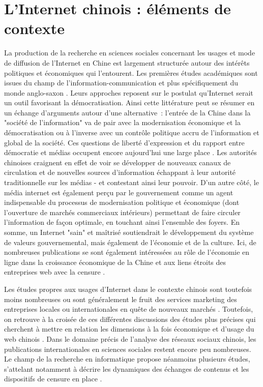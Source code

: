 \section{L’Internet chinois : éléments de contexte }
La production de la recherche en sciences sociales concernant les usages et mode de diffusion de l’Internet en Chine est largement structurée autour des intérêts politiques et économiques qui l’entourent. Les premières études académiques sont issues du champ de l’information-communication et plus spécifiquement du monde anglo-saxon \citep{Johnson1996,Qiu2005}. Leurs approches reposent sur le postulat qu'Internet serait un outil favorisant la démocratisation. Ainsi cette littérature peut se résumer en un échange d'arguments autour d'une alternative : l'entrée de la Chine dans la "société de l'information" va de pair avec la modernisation économique et la démocratisation ou à l’inverse avec un contrôle politique accru de l'information et global de la société. Ces questions de liberté d’expression et du rapport entre démocratie et médias occupent encore aujourd’hui une large place \citep{MacKinnon2009, Douzet2007, Yang2008}. Les autorités chinoises craignent en effet de voir se développer de nouveaux canaux de circulation et de nouvelles sources d'information échappant à leur autorité traditionnelle sur les médias - et contestant ainsi leur pouvoir. D'un autre côté, le média internet est également perçu par le gouvernement comme un agent indispensable du processus de modernisation politique et économique (dont l’ouverture de marchés commerciaux intérieurs) permettant de faire circuler l’information de façon optimale, en touchant ainsi l’ensemble des foyers. En somme, un Internet "sain" et maîtrisé soutiendrait le développement du système de valeurs gouvernemental, mais également de l’économie et de la culture. Ici, de nombreuses publications se sont également intéressées au rôle de l’économie en ligne dans la croissance économique de la Chine et aux liens étroits des entreprises web avec la censure \citep{Dann2008}.

Les études propres aux usages d’Internet dans le contexte chinois sont toutefois moins nombreuses ou sont généralement le fruit des services marketing des entreprises locales ou internationales en quête de nouveaux marchés \citep{Hwang2005, Bergstrom2012}. Toutefois, on retrouve à la croisée de ces différentes discussions des études plus précises qui cherchent à mettre en relation les dimensions à la fois économique et d’usage du web chinois \citep{Puel2009, Fernandez2010}. Dans le domaine précis de l’analyse des réseaux sociaux chinois, les publications internationales en sciences sociales restent encore peu nombreuses. Le champ de la recherche en informatique propose néanmoins plusieurs études, s’attelant notamment à décrire les dynamiques des échanges de contenus \citep{Yu2011} et les dispositifs de censure en place \citep{MacKinnon2012}. 

